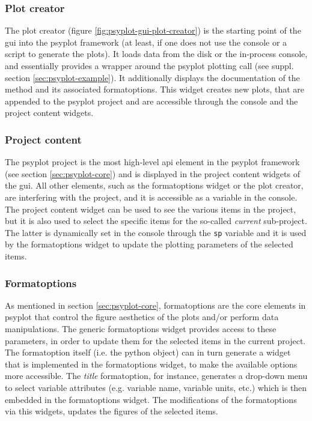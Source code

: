 \begin{refsection}
\subsubsection{Plot creator}
The plot creator (figure \ref{fig:psyplot-gui-plot-creator}) is the starting point of the \gls{gui} into the psyplot framework (at least, if one does not use the console or a script to generate the plots). It loads data from the disk or the in-process console, and essentially provides a wrapper around the psyplot plotting call (see suppl. section \ref{sec:psyplot-example}). It additionally displays the documentation of the method and its associated formatoptions. This widget creates new plots, that are appended to the psyplot project and are accessible through the console and the project content widgets.

\subsubsection{Project content}
The psyplot project is the most high-level \gls{api} element in the psyplot framework (see section \ref{sec:psyplot-core}) and is displayed in the project content widgets of the \gls{gui}. All other elements, such as the formatoptions widget or the plot creator, are interfering with the project, and it is accessible as a variable in the console. The project content widget can be used to see the various items in the project, but it is also used to select the specific items for the so-called \textit{current} sub-project. The latter is dynamically set in the console through the \texttt{sp} variable and it is used by the formatoptions widget to update the plotting parameters of the selected items.

\subsubsection{Formatoptions}
As mentioned in section \ref{sec:psyplot-core}, formatoptions are the core elements in psyplot that control the figure aesthetics of the plots and/or perform data manipulations. The generic formatoptions widget provides access to these parameters, in order to update them for the selected items in the current project. The formatoption itself (i.e. the python object) can in turn generate a widget that is implemented in the formatoptions widget, to make the available options more accessible. The \textit{title} formatoption, for instance, generates a drop-down menu to select variable attributes (e.g. variable name, variable units, etc.) which is then embedded in the formatoptions widget. The modifications of the formatoptions via this widgets, updates the figures of the selected items.


\end{refsection}
